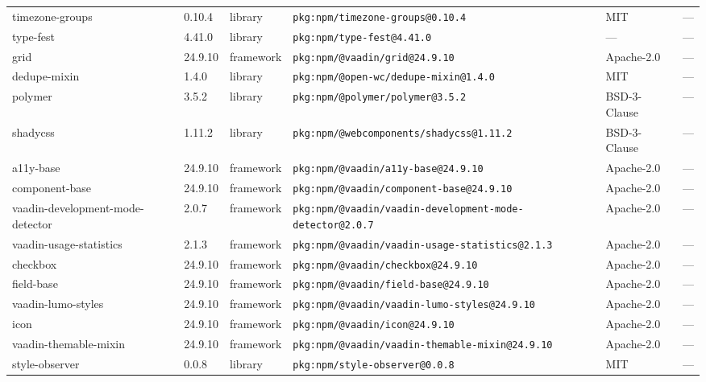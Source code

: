 \documentclass[11pt,a4paper]{article}
\begin{document}
\begin{longtable}{|p{4cm}|p{2cm}|p{1.6cm}|p{5cm}|p{1.5cm}|p{3.5cm}|}
\raggedright timezone-groups & 0.10.4 & library & \small\texttt{pkg:npm/timezone-groups@0.10.4} & MIT & \small — \\
\raggedright type-fest & 4.41.0 & library & \small\texttt{pkg:npm/type-fest@4.41.0} & — & \small — \\
\raggedright grid & 24.9.10 & framework & \small\texttt{pkg:npm/@vaadin/grid@24.9.10} & Apache-2.0 & \small — \\
\raggedright dedupe-mixin & 1.4.0 & library & \small\texttt{pkg:npm/@open-wc/dedupe-mixin@1.4.0} & MIT & \small — \\
\raggedright polymer & 3.5.2 & library & \small\texttt{pkg:npm/@polymer/polymer@3.5.2} & BSD-3-Clause & \small — \\
\raggedright shadycss & 1.11.2 & library & \small\texttt{pkg:npm/@webcomponents/shadycss@1.11.2} & BSD-3-Clause & \small — \\
\raggedright a11y-base & 24.9.10 & framework & \small\texttt{pkg:npm/@vaadin/a11y-base@24.9.10} & Apache-2.0 & \small — \\
\raggedright component-base & 24.9.10 & framework & \small\texttt{pkg:npm/@vaadin/component-base@24.9.10} & Apache-2.0 & \small — \\
\raggedright vaadin-development-mode-detector & 2.0.7 & framework & \small\texttt{pkg:npm/@vaadin/vaadin-development-mode-detector@2.0.7} & Apache-2.0 & \small — \\
\raggedright vaadin-usage-statistics & 2.1.3 & framework & \small\texttt{pkg:npm/@vaadin/vaadin-usage-statistics@2.1.3} & Apache-2.0 & \small — \\
\raggedright checkbox & 24.9.10 & framework & \small\texttt{pkg:npm/@vaadin/checkbox@24.9.10} & Apache-2.0 & \small — \\
\raggedright field-base & 24.9.10 & framework & \small\texttt{pkg:npm/@vaadin/field-base@24.9.10} & Apache-2.0 & \small — \\
\raggedright vaadin-lumo-styles & 24.9.10 & framework & \small\texttt{pkg:npm/@vaadin/vaadin-lumo-styles@24.9.10} & Apache-2.0 & \small — \\
\raggedright icon & 24.9.10 & framework & \small\texttt{pkg:npm/@vaadin/icon@24.9.10} & Apache-2.0 & \small — \\
\raggedright vaadin-themable-mixin & 24.9.10 & framework & \small\texttt{pkg:npm/@vaadin/vaadin-themable-mixin@24.9.10} & Apache-2.0 & \small — \\
\raggedright style-observer & 0.0.8 & library & \small\texttt{pkg:npm/style-observer@0.0.8} & MIT & \small — \\

\end{longtable}
\end{document}
